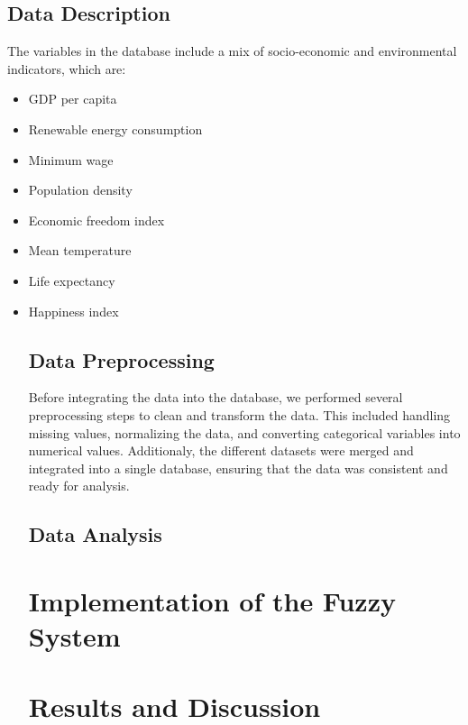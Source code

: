 \documentclass[fleqn,11pt]{article}
\begin{document}
\subsection{Data Description}
The variables in the database include a mix of socio-economic and environmental indicators, which are:
\begin{itemize}  %
	\item GDP per capita
	\item Renewable energy consumption
	\item Minimum wage
	\item Population density
	\item Economic freedom index
	\item Mean temperature
	\item Life expectancy
	\item Happiness index

\subsection{Data Preprocessing}
Before integrating the data into the database, we performed several preprocessing steps to clean and transform the data.
This included handling missing values, normalizing the data, and converting categorical variables into numerical values.
Additionaly, the different datasets were merged and integrated into a single database, ensuring that the data was consistent and ready for analysis.

\subsection{Data Analysis}


\section{Implementation of the Fuzzy System}


\section{Results and Discussion}


\end{itemize}
\end{document}
